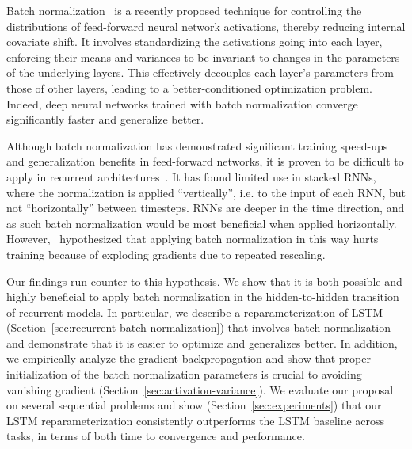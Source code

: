 \documentclass{article} %
\begin{document}
Batch normalization~\citep{batchnorm} is a recently proposed technique for controlling the
distributions of feed-forward neural network activations, thereby reducing internal covariate
shift.  It involves standardizing the activations going into each layer, enforcing their means and
variances to be invariant to changes in the parameters of the underlying layers.
This effectively decouples each layer's parameters from those of other layers, leading to a
better-conditioned optimization problem.  Indeed, deep neural networks trained with batch
normalization converge significantly faster and generalize better.

Although batch normalization has demonstrated significant training speed-ups and generalization
benefits in feed-forward networks, it is proven to be difficult to apply in recurrent
architectures~\citep{cesar,baidu}.  It has found limited use in stacked RNNs, where the
normalization is applied ``vertically'', i.e. to the input of each RNN, but not ``horizontally''
between timesteps.  RNNs are deeper in the time direction, and as such batch normalization would
be most beneficial when applied horizontally.  However,~\citet{cesar} hypothesized that applying
batch normalization in this way hurts training because of exploding gradients due to repeated
rescaling.

Our findings run counter to this hypothesis.  We show that it is both possible and highly
beneficial to apply batch normalization in the hidden-to-hidden transition of recurrent models.
In particular, we describe a reparameterization of LSTM
(Section~\ref{sec:recurrent-batch-normalization}) that involves batch normalization and
demonstrate that it is easier to optimize and generalizes better.  In addition, we empirically
analyze the gradient backpropagation and show that proper initialization of the batch
normalization parameters is crucial to avoiding vanishing gradient
(Section~\ref{sec:activation-variance}).  We evaluate our proposal on several sequential problems
and show (Section~\ref{sec:experiments}) that our LSTM reparameterization consistently outperforms
the LSTM baseline across tasks, in terms of both time to convergence and performance.
\end{document}
